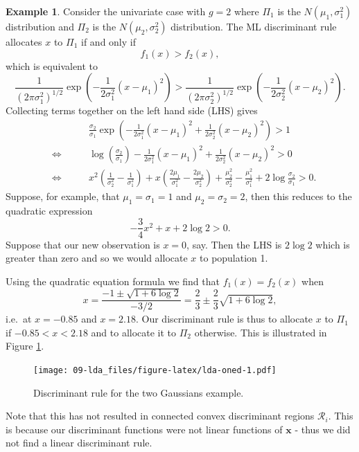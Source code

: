 \documentclass[
]{book}
\theoremstyle{definition}
\theoremstyle{definition}
\newtheorem{example}{Example}[chapter]
\theoremstyle{definition}
\theoremstyle{definition}
\theoremstyle{remark}
\begin{document}
\begin{example}
\protect\hypertarget{exm:exnine1}{}{\label{exm:exnine1} }Consider the univariate case with \(g=2\) where \(\Pi_1\) is the \(N(\mu_1,\sigma_1^2)\) distribution and \(\Pi_2\) is the \(N(\mu_2,\sigma_2^2)\) distribution. The ML discriminant rule allocates \(x\) to \(\Pi_1\) if and only if
\[
f_1(x) > f_2(x) ,
\]
which is equivalent to
\[
\frac{1}{(2\pi\sigma_1^2)^{1/2}} \exp \left(-\frac{1}{2\sigma_1^2} (x-\mu_1)^2 \right)
> \frac{1}{(2\pi\sigma_2^2)^{1/2}} \exp \left(-\frac{1}{2\sigma_2^2} (x-\mu_2)^2 \right).
\]
Collecting terms together on the left hand side (LHS) gives
\begin{eqnarray}
&&  \qquad \frac{\sigma_2}{\sigma_1} \exp \left(-\frac{1}{2\sigma_1^2} (x - \mu_1)^2 +\frac{1}{2\sigma_2^2} (x - \mu_2)^2 \right)> 1 \\
&\iff& \qquad \log \left(\frac{\sigma_2}{\sigma_1} \right)-\frac{1}{2\sigma_1^2} (x - \mu_1)^2 + \frac{1}{2\sigma_2^2} (x - \mu_2)^2 > 0 \\
& \iff & \qquad x^2 \left(\frac{1}{\sigma_2^2} - \frac{1}{\sigma_1^2} \right)
+ x \left(\frac{2 \mu_1}{\sigma_1^2} - \frac{2 \mu_2}{\sigma_2^2} \right)+ \frac{\mu_2^2}{\sigma_2^2} - \frac{\mu_1^2}{\sigma_1^2} + 2 \log \frac{\sigma_2}{\sigma_1} > 0. \label{eq:lda1d}
\end{eqnarray}
Suppose, for example, that \(\mu_1 = \sigma_1 = 1\) and \(\mu_2 = \sigma_2 = 2\), then this reduces to the quadratic expression
\[ -\frac{3}{4}x^2 + x + 2 \log 2 > 0.\]
Suppose that our new observation is \(x=0\), say. Then the LHS is \(2 \log 2\) which is greater than zero and so we would allocate \(x\) to population 1.

Using the quadratic equation formula we find that \(f_1(x)=f_2(x)\) when
\[x = \frac{-1 \pm \sqrt{1+6 \log 2}}{-3/2} = \frac{2}{3} \pm \frac{2}{3} \sqrt{1 + 6 \log 2},\] i.e.~at \(x = -0.85\) and \(x = 2.18\). Our discriminant rule is thus to allocate \(x\) to \(\Pi_1\) if \(-0.85 < x < 2.18\) and to allocate it to \(\Pi_2\) otherwise. This is illustrated in Figure \ref{fig:lda-oned}.
\end{example}

\begin{figure}
\centering
\texttt{[image: 09-lda\_files/figure-latex/lda-oned-1.pdf]}
\caption{\label{fig:lda-oned}Discriminant rule for the two Gaussians example.}
\end{figure}

Note that this has not resulted in connected convex discriminant regions \(\mathcal{R}_i\). This is because our discriminant functions were not linear functions of \(\mathbf x\) - thus we did not find a linear discriminant rule.
\end{document}
